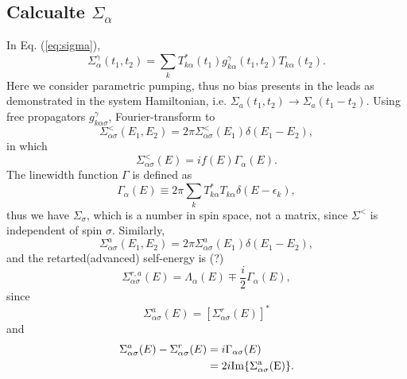 \documentclass[11pt,a4paper]{article}
\begin{document}
\subsection{Calcualte $\Sigma_{\alpha}$}
In Eq. (\ref{eq:sigma}), 
\begin{equation}
\Sigma_{\alpha}^{\gamma}\left(t_{1}, t_{2}\right)=\sum_{k} T_{k \alpha}^{*}\left(t_{1}\right) g_{k \alpha}^{\gamma}\left(t_{1}, t_{2}\right) T_{k \alpha}\left(t_{2}\right).
\end{equation}
Here we consider parametric pumping, thus no bias presents in the leads as demonstrated in the system Hamiltonian, i.e. $\Sigma_{a}(t_{1},t_{2}) \rightarrow \Sigma_{a} (t_{1}-t_{2})$. Using free propagators $g_{k\alpha\sigma}^{\gamma}$, Fourier-transform to
\begin{equation}
\Sigma_{\alpha\sigma}^{<}(E_{1},E_{2}) =2\pi \Sigma_{\alpha\sigma}^{<}(E_{1})\delta(E_{1}-E_{2}),
\end{equation}
in which
\begin{equation}
\Sigma_{\alpha\sigma}^{<}(E)=i  f(E) \Gamma_{\alpha}\left(E\right).
\end{equation}
The linewidth function $\Gamma$ is defined as
\begin{equation}
\Gamma_{\alpha}(E) \equiv 2 \pi \sum_{k} T_{k \alpha}^{*} T_{k \alpha} \delta\left(E-\epsilon_{k}\right),
\end{equation}
thus we have $\Sigma_{\sigma}$, which is a number in spin space, not a matrix, since $\Sigma^{<}$ is independent of spin $\sigma$. Similarly,
\begin{equation}
\Sigma_{\alpha\sigma}^{a}(E_{1},E_{2}) =2\pi \Sigma_{\alpha\sigma}^{a}(E_{1})\delta(E_{1}-E_{2}),
\end{equation}
and the retarted(advanced) self-energy is (?)
\begin{equation}
\Sigma_{\alpha\sigma}^{r,a}(E)=\Lambda_{\alpha}(E) \mp \frac{i}{2}\Gamma_{\alpha}(E),
\end{equation}
since
\begin{equation}
\Sigma_{\alpha\sigma}^{a}(E)=[\Sigma_{\alpha\sigma}^{r}(E)]^{*}
\end{equation}
and
\begin{equation}
\begin{split}
\Sigma_{\alpha\sigma}^{a}(E)-\Sigma_{\alpha\sigma}^{r}(E)&=i \Gamma_{\alpha\sigma}(E) \\
& = 2i\rm{Im}\{\Sigma_{\alpha\sigma}^{a}(E)\}.
\end{split}
\end{equation}
\end{document}
